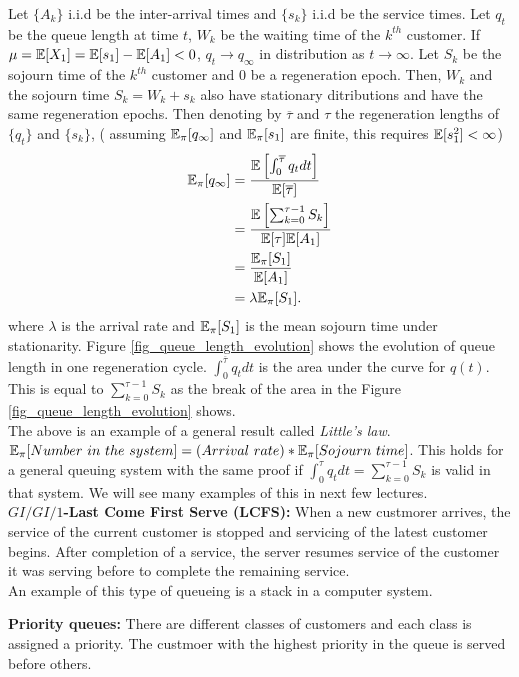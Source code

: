\documentclass[all-lectures.tex]{subfiles}
\begin{document}
Let $\{A_k\}$ i.i.d be the inter-arrival times and $\{s_k\}$ i.i.d be the service times. Let $q_t$ be the queue length at time $t$, $W_k$ be the waiting time of the $k^{th}$ customer. If $\mu = \mathbb{E}[X_1] = \mathbb{E}[s_1] - \mathbb{E}[A_1] < 0$, $q_t \to q_\infty$ in distribution as $t \to \infty$. Let $S_k$ be the sojourn time of the $k^{th}$ customer and $0$ be a regeneration epoch. Then, $W_k$ and the sojourn time $S_k = W_k + s_k$ also have stationary ditributions and have the same regeneration epochs. Then denoting by $\overline{\tau}$ and $\tau$ the regeneration lengths of $\{q_t\}$ and $\{s_k\}$, ( assuming $\mathbb{E}_\pi[q_\infty]$ and $\mathbb{E}_\pi[s_1]$ are finite, this requires $\mathbb{E}[s_1^2] < \infty$)
\begin{align*}
\mathbb{E}_{\pi}[q_\infty] &= \frac{\mathbb{E}\left[ \int_0^{\overline{\tau}} q_t dt\right]}{\mathbb{E}[\overline{\tau}]} \\
&= \frac{\mathbb{E}\left[ \sum_{k=0}^{\tau-1} S_k \right]}{\mathbb{E}[\tau]\mathbb{E}[A_1]} \\
&= \frac{ \mathbb{E}_{\pi}[S_1] }{\mathbb{E}[A_1]} \\
&= \lambda \mathbb{E}_{\pi}[S_1].
\end{align*}
where $\lambda$ is the arrival rate and $\mathbb{E}_{\pi}[ S_1]$ is the mean sojourn time under stationarity. Figure \ref{fig_queue_length_evolution} shows the evolution of queue length in one regeneration cycle. $\int_0^{\overline{\tau}} q_t dt$ is the area under the curve for $q(t)$. This is equal to  $\sum_{k=0}^{\tau-1} S_k $ as the break of the area in the Figure \ref{fig_queue_length_evolution} shows.\\
\indent The above is an example of a general result called \textit{Little's law}. 
$\mathbb{E}_{\pi}[Number\ in\ the\ system] = (Arrival\ rate) * \mathbb{E}_{\pi}[Sojourn \ time]$. This holds for a general queuing system with the same proof if $\int_0^\tau q_t dt = \sum_{k=0}^{\tau -1} S_k$ is valid in that system. We will see many examples of this in next few lectures.\\

\indent \textbf{$GI/GI/1$-Last Come First Serve (LCFS):} When a new custmorer arrives, the service of the current customer is stopped and servicing of the latest customer begins. After completion of a service, the server resumes service of the customer it was serving before to complete the remaining service. \\
\indent An example of this type of queueing is a stack in a computer system.

\textbf{Priority queues:} There are different classes of customers and each class is assigned a priority. The custmoer with the highest priority in the queue is served before others. 
\end{document}

